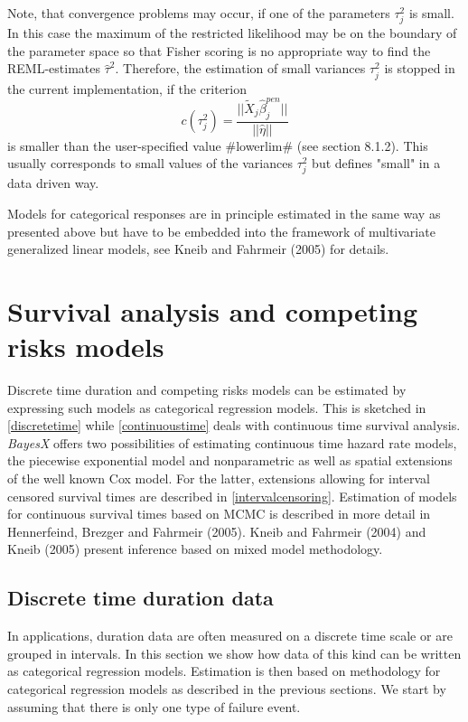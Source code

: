 \documentclass[11pt,a4paper,twoside]{bayesxarticle}
\begin{document}
Note, that convergence problems may occur, if one of the
parameters $\tau_j^2$ is small. In this case the maximum of the
restricted likelihood may be on the boundary of the parameter
space so that Fisher scoring is no appropriate way to find the
REML-estimates $\hat{\tau}^2$. Therefore, the estimation of small
variances $\tau_j^2$ is stopped in the current implementation, if
the criterion
\begin{equation}\label{remlstopcrit}
 c(\tau_j^2)=\frac{||\tilde{X}_j\hat{\beta}_j^{pen}||}{||\hat{\eta}||}
\end{equation}
is smaller than the user-specified value #lowerlim# (see section
8.1.2). This usually corresponds to small values of the variances
$\tau_j^2$ but defines "small" in a data driven way.

Models for categorical responses are in principle estimated in the
same way as presented above but have to be embedded into the
framework of multivariate generalized linear models, see Kneib and
Fahrmeir (2005) for details.

\section{Survival analysis and competing risks models}
\label{survivalAnalysis}

Discrete time duration and competing risks models can be estimated
by expressing such models as categorical regression models. This is
sketched in \autoref{discretetime} while \autoref{continuoustime}
deals with continuous time survival analysis. \textit{BayesX} offers
two possibilities of estimating continuous time hazard rate models,
the piecewise exponential model and nonparametric as well as spatial
extensions of the well known Cox model. For the latter, extensions
allowing for interval censored survival times are described in
\autoref{intervalcensoring}. Estimation of models for continuous
survival times based on MCMC is described in more detail in
Hennerfeind, Brezger and Fahrmeir (2005). Kneib and Fahrmeir (2004)
and Kneib (2005) present inference based on mixed model methodology.


\subsection{Discrete time duration data}
\label{discretetime}

In applications, duration data are often measured on a discrete
time scale or are grouped in intervals. In this section we show
how data of this kind can be written as categorical regression
models.  Estimation is then based on methodology for categorical
regression models as described in the previous sections. We start
by assuming that there is only one type of failure event.
\end{document}
